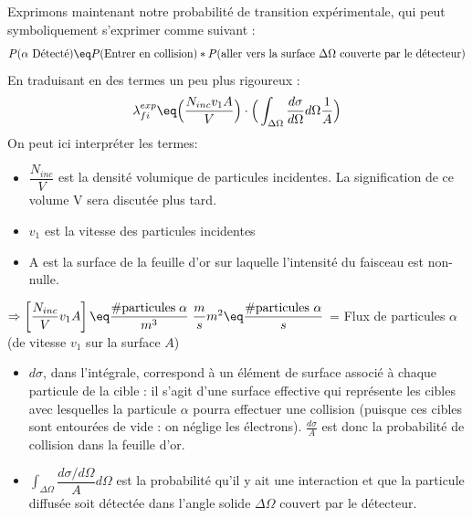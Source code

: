 Exprimons maintenant notre probabilité de transition expérimentale, qui peut symboliquement s'exprimer comme suivant :
\begin{equation*}
    P(\alpha\text{ Détecté}) \eq P(\text{Entrer en collision}) * P(\text{aller vers la surface } \Delta \Omega \text{ couverte par le détecteur})
\end{equation*}
En traduisant en des termes un peu plus rigoureux :
\begin{equation}
    \lambda_{fi}^{exp} \eq
    \Big(   \frac{N_{inc} v_1 A}{V}   \Big) \cdot
    \Big(
    \int_{\Delta \Omega} \dfrac{d\sigma}{d\Omega} d\Omega \frac{1}{A}
    \Big)
    \label{lambda_exp}
\end{equation}
On peut ici interpréter les termes:
\begin{itemize}[label=$\bullet$]
    \item $\dfrac{N_{inc}}{V}$ est la densité volumique de particules incidentes. La signification de ce volume V sera discutée plus tard.
    \item $v_1$ est la vitesse des particules incidentes
    \item A est la surface de la feuille d'or sur laquelle l'intensité du faisceau est non-nulle.\\
\end{itemize}

    $\Rightarrow \left[\dfrac{N_{inc}}{V}v_1A\right] 
    \eq 
    \dfrac{\mbox{\#particules}\; \alpha}{m^3}\;\dfrac{m}{s}m^2 
    \eq 
    \dfrac{\mbox{\#particules}\ \alpha}{s}$  =  Flux de particules $\alpha$ (de vitesse $v_1$ sur la surface $A$)\\
    
\begin{itemize}[label=$\bullet$]  
    \item $d\sigma$, dans l'intégrale, correspond à un élément de surface associé à chaque particule de la cible : il s'agit d'une surface effective qui représente les cibles avec lesquelles la particule $\alpha$ pourra effectuer une collision (puisque ces cibles sont entourées de vide : on néglige les électrons). $\frac{d\sigma}{A}$ est donc la probabilité de collision dans la feuille d'or.
    
    \item $\int_{\Delta \Omega} \dfrac{d\sigma/d\Omega}{A}d\Omega$ est la probabilité qu'il y ait une interaction et que la particule diffusée soit détectée dans l'angle solide $\Delta \Omega$ couvert par le détecteur.\\
\end{itemize}

